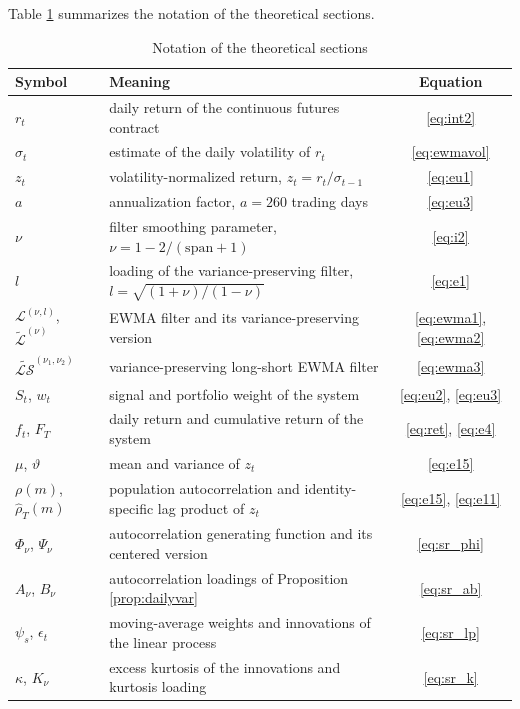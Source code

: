\documentclass[hidelinks]{siamonline250211}
\newcommand{\spn}{\mathrm{span}}
\begin{document}
Table \ref{tab:notation} summarizes the notation of the theoretical sections.

\begin{table}[!htb]
	\footnotesize
	\centering
	\caption{Notation of the theoretical sections}\label{tab:notation}
	\begin{tabular}{llc}
		\hline
		Symbol & Meaning & Equation \\
		\hline
		$r_{t}$ & daily return of the continuous futures contract & \eqref{eq:int2} \\
		$\sigma_{t}$ & estimate of the daily volatility of $r_{t}$ & \eqref{eq:ewmavol} \\
		$z_{t}$ & volatility-normalized return, $z_{t}=r_{t}/\sigma_{t-1}$ & \eqref{eq:eu1} \\
		$a$ & annualization factor, $a=260$ trading days & \eqref{eq:eu3} \\
		$\nu$ & filter smoothing parameter, $\nu=1-2/(\spn+1)$ & \eqref{eq:i2} \\
		$l$ & loading of the variance-preserving filter, $l=\sqrt{(1+\nu)/(1-\nu)}$ & \eqref{eq:e1} \\
		$\mathcal{L}^{(\nu,l)}$, $\widetilde{\mathcal{L}}^{(\nu)}$ & EWMA filter and its variance-preserving version & \eqref{eq:ewma1}, \eqref{eq:ewma2} \\
		$\widetilde{\mathcal{LS}}^{(\nu_{1},\nu_{2})}$ & variance-preserving long-short EWMA filter & \eqref{eq:ewma3} \\
		$S_{t}$, $w_{t}$ & signal and portfolio weight of the system & \eqref{eq:eu2}, \eqref{eq:eu3} \\
		$f_{t}$, $F_{T}$ & daily return and cumulative return of the system & \eqref{eq:ret}, \eqref{eq:e4} \\
		$\mu$, $\vartheta$ & mean and variance of $z_{t}$ & \eqref{eq:e15} \\
		$\rho(m)$, $\hat{\rho}_{T}(m)$ & population autocorrelation and identity-specific lag product of $z_{t}$ & \eqref{eq:e15}, \eqref{eq:e11} \\
		$\Phi_{\nu}$, $\Psi_{\nu}$ & autocorrelation generating function and its centered version & \eqref{eq:sr_phi} \\
		$A_{\nu}$, $B_{\nu}$ & autocorrelation loadings of Proposition \ref{prop:dailyvar} & \eqref{eq:sr_ab} \\
		$\psi_{s}$, $\epsilon_{t}$ & moving-average weights and innovations of the linear process & \eqref{eq:sr_lp} \\
		$\kappa$, $K_{\nu}$ & excess kurtosis of the innovations and kurtosis loading & \eqref{eq:sr_k} \\

\end{tabular}
\end{table}
\end{document}
